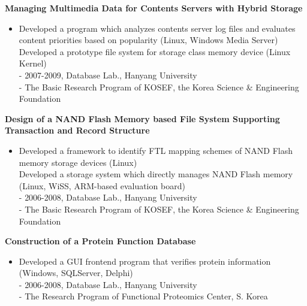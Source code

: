 \documentclass{res}
\begin{document}
\begin{resume}
  {\bf Managing Multimedia Data for Contents Servers with Hybrid Storage}
    \begin{itemize} %
      \item[] 
	Developed a program which analyzes contents server log files and
	evaluates content priorities based on popularity (Linux, Windows Media
	Server) \\
	Developed a prototype file system for storage class memory device
	(Linux Kernel) 
	\vspace{0.05in}\\
        - {\small 2007-2009, Database Lab., Hanyang University}\\
	- {\small The Basic Research Program of KOSEF, the Korea Science \& Engineering
	Foundation}
      \end{itemize}

  {\bf Design of a NAND Flash Memory based File System Supporting Transaction and
       Record Structure} 
        \begin{itemize}
        \item[]
	Developed a framework to identify FTL mapping schemes of NAND Flash
	memory storage devices (Linux)\\
	Developed a storage system which directly manages NAND Flash memory
	(Linux, WiSS, ARM-based evaluation board)
	\vspace{0.05in}\\
	- {\small 2006-2008, Database Lab., Hanyang University}\\
	- {\small The Basic Research Program of KOSEF, the Korea Science \& Engineering
	Foundation}
       \end{itemize}

   {\bf Construction of a Protein Function Database} 
        \begin{itemize}
        \item[] 
        Developed a GUI frontend program that verifies protein information
	(Windows, SQLServer, Delphi)
	\vspace{0.05in}\\
	- {\small 2006-2008, Database Lab., Hanyang University}\\
	- {\small The Research Program of Functional Proteomics Center, S.
	Korea}
       \end{itemize} 
 

\end{resume}
\end{document}
